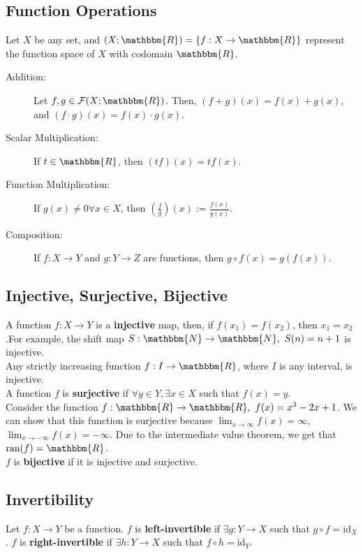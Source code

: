 \documentclass[10pt]{extarticle}
\begin{document}
  \subsection{Function Operations}%
      Let $X$ be any set, and $\mathcal(X;\mathbbm{R}) = \{f:X\rightarrow \mathbbm{R}\}$ represent the function space of $X$ with codomain $\mathbbm{R}$.
    \begin{description}
      \item[Addition:] Let $f,g\in \mathcal{F}(X;\mathbbm{R})$. Then, $(f+g)(x) = f(x) + g(x)$, and $(f\cdot g)(x) = f(x)\cdot g(x)$.
      \item[Scalar Multiplication:]If $t\in \mathbbm{R}$, then $(tf)(x) = tf(x)$.
      \item[Function Multiplication:] If $g(x)\neq 0\forall x\in X$, then $\left(\frac{f}{g}\right)(x) := \frac{f(x)}{g(x)}$.
      \item[Composition:] If $f:X\rightarrow Y$ and $g:Y\rightarrow Z$ are functions, then $g\circ f(x) = g(f(x))$.
    \end{description}
    \subsection{Injective, Surjective, Bijective}%
      A function $f:X\rightarrow Y$ is a \textbf{injective} map, then, if $f(x_1) = f(x_2)$, then $x_1 = x_2$.For example, the shift map $S:\mathbbm{N} \rightarrow \mathbbm{N},~S(n) = n+1$ is injective.\\

      Any strictly increasing function $f:I\rightarrow \mathbbm{R}$, where $I$ is any interval, is injective.\\

      A function $f$ is \textbf{surjective} if $\forall y\in Y, \exists x\in X$ such that $f(x) = y$.\\

      Consider the function $f:\mathbbm{R} \rightarrow \mathbbm{R},~f(x) = x^3-2x+1$. We can show that this function is surjective because $\lim_{x\rightarrow \infty}f(x) = \infty$, $\lim_{x\rightarrow -\infty} f(x) = -\infty$. Due to the intermediate value theorem, we get that $\text{ran}(f) = \mathbbm{R}$.\\

      $f$ is \textbf{bijective} if it is injective and surjective.
    \subsection{Invertibility}%
      Let $f:X\rightarrow Y$ be a function. $f$ is \textbf{left-invertible} if $\exists g:Y\rightarrow X$ such that $g\circ f = \text{id}_X$. $f$ is \textbf{right-invertible} if $\exists h:Y\rightarrow X$ such that $f\circ h = \text{id}_Y$.\\
\end{document}
